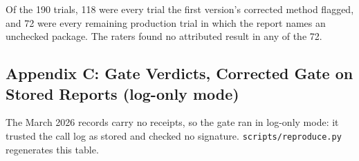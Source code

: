 \documentclass[
]{article}
\begin{document}
Of the 190 trials, 118 were every trial the first version's corrected
method flagged, and 72 were every remaining production trial in which
the report names an unchecked package. The raters found no attributed
result in any of the 72.

\subsection{Appendix C: Gate Verdicts, Corrected Gate on Stored Reports
(log-only
mode)}\label{appendix-c-gate-verdicts-corrected-gate-on-stored-reports-log-only-mode}

The March 2026 records carry no receipts, so the gate ran in log-only
mode: it trusted the call log as stored and checked no signature.
\texttt{scripts/reproduce.py} regenerates this table.
\end{document}
